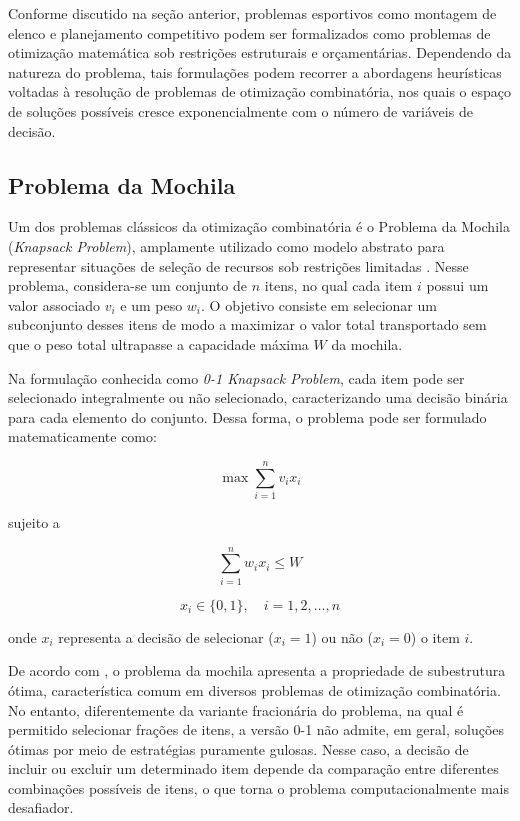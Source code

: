 Conforme discutido na seção anterior, problemas esportivos como montagem de elenco e planejamento competitivo 
podem ser formalizados como problemas de otimização matemática sob restrições estruturais e orçamentárias. 
Dependendo da natureza do problema, tais formulações podem recorrer a abordagens heurísticas voltadas à resolução 
de problemas de otimização combinatória, nos quais o espaço de soluções possíveis cresce exponencialmente com o número de variáveis de decisão.

\subsection{Problema da Mochila}

Um dos problemas clássicos da otimização combinatória é o Problema da Mochila (\textit{Knapsack Problem}), amplamente utilizado como modelo
abstrato para representar situações de seleção de recursos sob restrições limitadas \cite{Cormen2009}. Nesse problema, considera-se um conjunto
de $n$ itens, no qual cada item $i$ possui um valor associado $v_i$ e um peso $w_i$. O objetivo consiste em selecionar um subconjunto desses itens
de modo a maximizar o valor total transportado sem que o peso total ultrapasse a capacidade máxima $W$ da mochila.

Na formulação conhecida como \textit{0-1 Knapsack Problem}, cada item pode ser selecionado integralmente ou não selecionado, caracterizando
uma decisão binária para cada elemento do conjunto. Dessa forma, o problema pode ser formulado matematicamente como:

\begin{equation}
\max \sum_{i=1}^{n} v_i x_i
\end{equation}

sujeito a

\begin{equation}
\sum_{i=1}^{n} w_i x_i \leq W
\end{equation}

\begin{equation}
x_i \in \{0,1\}, \quad i = 1,2,\dots,n
\end{equation}

onde $x_i$ representa a decisão de selecionar ($x_i = 1$) ou não ($x_i = 0$) o item $i$.

De acordo com \cite{Cormen2009}, o problema da mochila apresenta a propriedade de subestrutura ótima, característica comum em diversos problemas
de otimização combinatória. No entanto, diferentemente da variante fracionária do problema, na qual é permitido selecionar frações de itens,
a versão 0-1 não admite, em geral, soluções ótimas por meio de estratégias puramente gulosas. Nesse caso, a decisão de incluir ou excluir um
determinado item depende da comparação entre diferentes combinações possíveis de itens, o que torna o problema computacionalmente mais desafiador.

